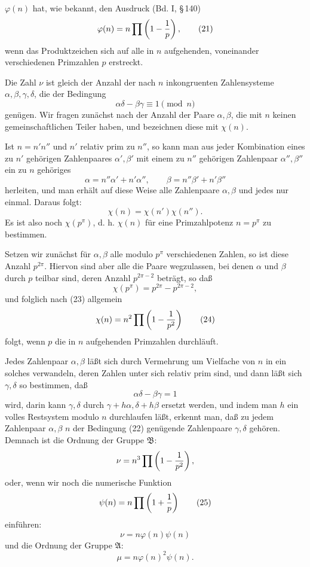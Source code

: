 \documentclass[11pt]{article}
\begin{document}
$\varphi(n)$ hat, wie bekannt, den Ausdruck (Bd. I, \S\,140)
\begin{equation}
 \varphi(n)=n\prod\left(1-{1\over p}\right),
\tag{21}
\end{equation}
wenn das Produktzeichen sich auf alle in $n$ aufgehenden, voneinander verschiedenen
Primzahlen $p$ erstreckt.

Die Zahl $\nu$ ist gleich der Anzahl der nach $n$ inkongruenten Zahlensysteme
$\alpha,\beta,\gamma,\delta$, die der Bedingung
\begin{equation}
 \alpha\delta-\beta\gamma\equiv1\pmod n
\tag{22}
\end{equation}
genügen. Wir fragen zunächst nach der Anzahl der Paare $\alpha,\beta$, die mit $n$ keinen
gemeinschaftlichen Teiler haben, und bezeichnen diese mit $\chi(n)$.

Ist $n=n'n''$ und $n'$ relativ prim zu $n''$, so kann man aus jeder Kombination eines zu
$n'$ gehörigen Zahlenpaares $\alpha',\beta'$ mit einem zu $n''$ gehörigen Zahlenpaar
$\alpha'',\beta''$ ein zu $n$ gehöriges
\[
 \alpha=n''\alpha'+n'\alpha'',
 \qquad
 \beta=n''\beta'+n'\beta''
\]
herleiten, und man erhält auf diese Weise alle Zahlenpaare $\alpha,\beta$ und jedes nur
einmal. Daraus folgt:
\begin{equation}
 \chi(n)=\chi(n')\chi(n'').
\tag{23}
\end{equation}
Es ist also noch $\chi(p^\pi)$, d. h. $\chi(n)$ für eine Primzahlpotenz $n=p^\pi$ zu
bestimmen.

Setzen wir zunächst für $\alpha,\beta$ alle modulo $p^\pi$ verschiedenen Zahlen, so ist
diese Anzahl $p^{2\pi}$. Hiervon sind aber alle die Paare wegzulassen, bei denen $\alpha$
und $\beta$ durch $p$ teilbar sind, deren Anzahl $p^{2\pi-2}$ beträgt, so daß
\[
 \chi(p^\pi)=p^{2\pi}-p^{2\pi-2},
\]
und folglich nach (23) allgemein
\begin{equation}
 \chi(n)=n^2\prod\left(1-{1\over p^2}\right)
\tag{24}
\end{equation}
folgt, wenn $p$ die in $n$ aufgehenden Primzahlen durchläuft.

Jedes Zahlenpaar $\alpha,\beta$ läßt sich durch Vermehrung um Vielfache von $n$ in ein
solches verwandeln, deren Zahlen unter sich relativ prim sind, und dann läßt sich
$\gamma,\delta$ so bestimmen, daß
\[
 \alpha\delta-\beta\gamma=1
\]
wird, darin kann $\gamma,\delta$ durch $\gamma+h\alpha,\delta+h\beta$ ersetzt werden, und
indem man $h$ ein volles Restsystem modulo $n$ durchlaufen läßt, erkennt man, daß zu
jedem Zahlenpaar $\alpha,\beta$ $n$ der Bedingung (22) genügende Zahlenpaare
$\gamma,\delta$ gehören. Demnach ist die Ordnung der Gruppe $\mathfrak B$:
\[
 \nu=n^3\prod\left(1-{1\over p^2}\right),
\]
oder, wenn wir noch die numerische Funktion
\begin{equation}
 \psi(n)=n\prod\left(1+{1\over p}\right)
\tag{25}
\end{equation}
einführen:
\begin{equation}
 \nu=n\varphi(n)\psi(n)
\tag{26}
\end{equation}
und die Ordnung der Gruppe $\mathfrak A$:
\begin{equation}
 \mu=n\varphi(n)^2\psi(n).
\tag{27}
\end{equation}
\end{document}
